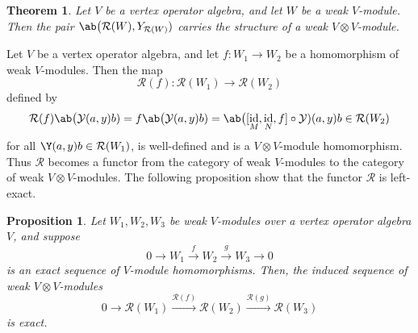 \documentclass[12pt, english]{article}
\numberwithin{equation}{section}
\DeclareMathOperator{\id}{id}
\theoremstyle{plain}
\newtheorem{theorem}[lemma]{Theorem}
\newtheorem{proposition}[lemma]{Proposition}
\theoremstyle{definition}
\theoremstyle{remark}
\begin{document}
	\begin{theorem}
		Let $V$ be a vertex operator algebra, and let $W$ be a weak $V$-module.
		Then the pair $\ab\big(\mathcal{R}(W), Y_{\mathcal{R}(W)})$ carries the structure of a weak $V \otimes V$-module.
	\end{theorem}
	
	Let $V$ be a vertex operator algebra, and let $f \colon W_1 \to W_2$ be a homomorphism of weak $V$-modules.
	Then the map
	\[
	\mathcal{R}(f) \colon \mathcal{R}(W_1) \longrightarrow \mathcal{R}(W_2)
	\]
	defined by
	\[
	\mathcal{R}(f) \ab\big(\mathcal{Y}(a, y) b) = f \ab\big(\mathcal{Y}(a, y) b)
	= \ab\big([\id_{M}, \id_{N}, f] \circ \mathcal{Y}) (a, y) b \in \mathcal{R}(W_2)
	\]
	for all $\Y(a, y) b \in \mathcal{R}(W_1)$,
	is well-defined and is a $V \otimes V$-module homomorphism.
	Thus $\mathcal{R}$ becomes a functor from the category of weak $V$-modules to the category of weak $V\otimes V$-modules.
	The following proposition show that the functor $\mathcal{R}$ is left-exact.
	
	\begin{proposition}
		Let $ W_1, W_2, W_3$ be weak $V$-modules over a vertex operator algebra $V$, and suppose
		\[
		0 \to W_1 \xrightarrow{f} W_2 \xrightarrow{g} W_3 \to 0
		\]
		is an exact sequence of $V$-module homomorphisms.
		Then, the induced sequence of weak $V \otimes V$-modules
		\[
		0 \to \mathcal{R}(W_1) \xrightarrow{\mathcal{R}(f)} \mathcal{R}(W_2) \xrightarrow{\mathcal{R}(g)} \mathcal{R}(W_3)
		\]
		is exact.
		
	\end{proposition}
	
\end{document}
